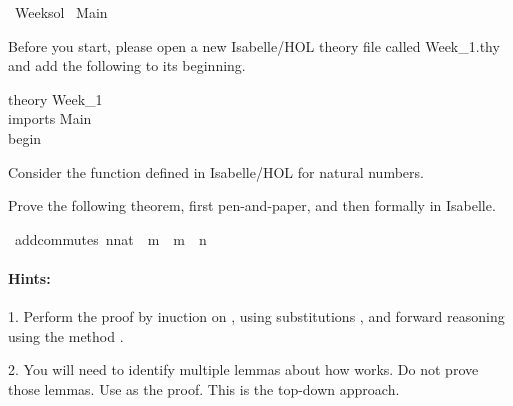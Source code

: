 %
\begin{isabellebody}%
%
%
\isadelimtheory
\isanewline
%
\endisadelimtheory
%
\isatagtheory
{}\isamarkupfalse%
\ Week{\isacharunderscore}{\kern0pt}{}{\isacharunderscore}{\kern0pt}sol\isanewline
{}\ Main\isanewline
{}%
\endisatagtheory
{\isafoldtheory}%
%
\isadelimtheory
%
\endisadelimtheory
%
\begin{isamarkuptext}%
\vspace{15ex}%
\end{isamarkuptext}\isamarkuptrue%
%
\begin{isamarkuptext}%
Before you start, please open a new Isabelle/HOL theory file called Week\_1.thy and add the
       following to its beginning.

\noindent theory Week\_1\\
imports Main\\
begin%
\end{isamarkuptext}\isamarkuptrue%
%
\begin{isamarkuptext}%
%
\end{isamarkuptext}\isamarkuptrue%
%
\begin{isamarkuptext}%
Consider the function \isa{{\isacharparenleft}{\kern0pt}{\isacharplus}{\kern0pt}{\isacharparenright}{\kern0pt}} defined in Isabelle/HOL for natural numbers.

Prove the following theorem, first pen-and-paper, and then formally in Isabelle.%
\end{isamarkuptext}\isamarkuptrue%
\isamarkupfalse%
\ add{\isacharunderscore}{\kern0pt}commutes{\isacharcolon}{\kern0pt}\ {\isachardoublequoteopen}{\isacharparenleft}{\kern0pt}n{\isacharcolon}{\kern0pt}{\isacharcolon}{\kern0pt}nat{\isacharparenright}{\kern0pt}\ {\isacharplus}{\kern0pt}\ m\ {\isacharequal}{\kern0pt}\ m\ {\isacharplus}{\kern0pt}\ n{\isachardoublequoteclose}%
\begin{isamarkuptext}%
\paragraph{Hints:} 

 1. Perform the proof by inuction on , using substitutions , and forward reasoning using
   the method .

 2. You will need to identify multiple lemmas about how  works. Do not prove those lemmas. Use 
     as the proof. This is the top-down approach. 


\end{isamarkuptext}
\end{isabellebody}
